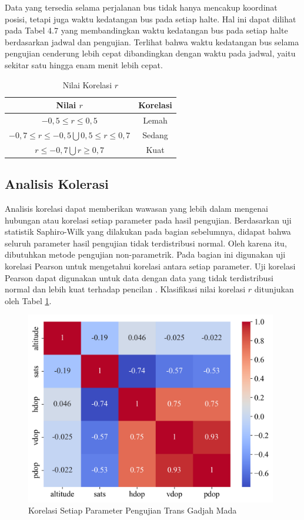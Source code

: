 Data yang tersedia selama perjalanan bus tidak hanya mencakup koordinat posisi, tetapi juga waktu kedatangan bus pada setiap halte. Hal ini dapat dilihat pada Tabel 4.7 yang membandingkan waktu kedatangan bus pada setiap halte berdasarkan jadwal dan pengujian. Terlihat bahwa waktu kedatangan bus selama pengujian cenderung lebih cepat dibandingkan dengan waktu pada jadwal, yaitu sekitar satu hingga enam menit lebih cepat.

\begin{table}[H]
	\caption{Nilai Korelasi $r$ \cite{Carlton2012}}
	\vspace{0.5em}
	\centering
	\begin{tabular}{cc}
		\hline
		\textbf{Nilai $r$} & \textbf{Korelasi}\\
		\hline 
		$-0,5 \leq r \leq 0,5$ & Lemah \\ 
		$ -0,7 \le r \le -0,5 \bigcup 0,5 \le r \le 0,7$ & Sedang \\
		$r \leq -0,7 \bigcup r \geq 0,7$ & Kuat \\
		\hline
	\end{tabular}
	\label{Tab: korelasi-table}
\end{table}

\subsection{Analisis Kolerasi}
Analisis korelasi dapat memberikan wawasan yang lebih dalam mengenai hubungan atau korelasi setiap parameter pada hasil pengujian. Berdasarkan uji statistik Saphiro-Wilk yang dilakukan pada bagian sebelumnya, didapat bahwa seluruh parameter hasil pengujian tidak terdistribusi normal. Oleh karena itu, dibutuhkan metode pengujian non-parametrik. Pada bagian ini digunakan uji korelasi Pearson untuk mengetahui korelasi antara setiap parameter. Uji korelasi Pearson dapat digunakan untuk data dengan data yang tidak terdistribusi normal dan lebih kuat terhadap pencilan \cite{Schober2018}. Klasifikasi nilai korelasi $r$ ditunjukan oleh Tabel \ref{Tab: korelasi-table}.

\begin{figure}[H]
	\centering
	\includegraphics[width=11cm]{contents/chapter-4/pengujian-bergerak/corr.png}
	\caption{Korelasi Setiap Parameter Pengujian Trans Gadjah Mada}
	\label{Fig: moving-corr}
\end{figure}

